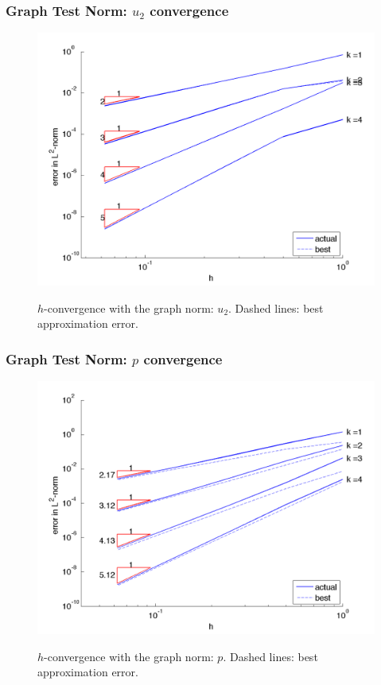 \documentclass[mathserif]{beamer}
\begin{document}
\addtocounter{framenumber}{-1} %
\begin{frame}
\frametitle{Graph Test Norm: $u_{2}$ convergence}
\begin{figure}[!htb]
\center
{\setlength{\fboxsep}{1pt}\colorbox{pecos2}{\includegraphics[scale=.38]{../figures/u2_graph_h.png}}}
\caption{$h$-convergence with the graph norm: $u_{2}$.  Dashed lines: best approximation error.}
\end{figure}
\end{frame}

\addtocounter{framenumber}{-1} %
\begin{frame}
\frametitle{Graph Test Norm: $p$ convergence}
\begin{figure}[!htb]
\center
{\setlength{\fboxsep}{1pt}\colorbox{pecos2}{\includegraphics[scale=.38]{../figures/pressure_graph_h.png}}}
\caption{$h$-convergence with the graph norm: $p$.  Dashed lines: best approximation error.}
\end{figure}
\end{frame}
\end{document}
